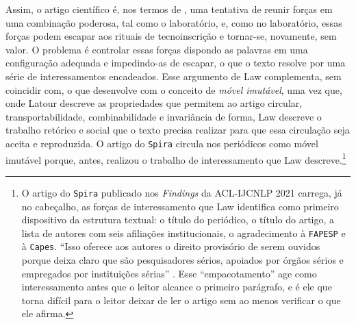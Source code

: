 Assim, o artigo científico é, nos termos de \textcite{Law1986Laboratories}, uma tentativa de reunir forças em uma combinação poderosa, tal como o laboratório, e, como no laboratório, essas forças podem escapar aos rituais de tecnoinscrição e tornar-se, novamente, sem valor. O problema é controlar essas forças dispondo as palavras em uma configuração adequada e impedindo-as de escapar, o que o texto resolve por uma série de interessamentos encadeados. Esse argumento de Law complementa, sem coincidir com, o que \textcite{Latour2011CienciaEmAcao} desenvolve com o conceito de \textit{móvel imutável}, uma vez que, onde Latour descreve as propriedades que permitem ao artigo circular, transportabilidade, combinabilidade e invariância de forma, Law descreve o trabalho retórico e social que o texto precisa realizar para que essa circulação seja aceita e reproduzida. O artigo do \texttt{Spira} circula nos periódicos como móvel imutável porque, antes, realizou o trabalho de interessamento que Law descreve.\footnote{O artigo do \texttt{Spira} publicado nos \textit{Findings} da ACL-IJCNLP 2021 carrega, já no cabeçalho, as forças de interessamento que Law identifica como primeiro dispositivo da estrutura textual: o título do periódico, o título do artigo, a lista de autores com seis afiliações institucionais, o agradecimento à \texttt{FAPESP} e à \texttt{Capes}. \enquote{Isso oferece aos autores o direito provisório de serem ouvidos porque deixa claro que são pesquisadores sérios, apoiados por órgãos sérios e empregados por instituições sérias} \parencite[p.~73]{Law1986Laboratories}. Esse \enquote{empacotamento} age como interessamento antes que o leitor alcance o primeiro parágrafo, e é ele que torna difícil para o leitor deixar de ler o artigo sem ao menos verificar o que ele afirma.}

